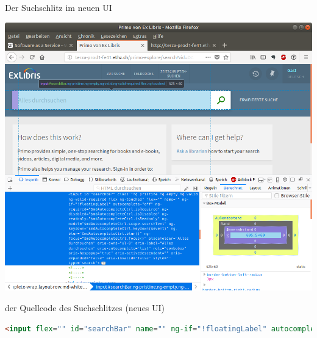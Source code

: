 \begin{frame}{Der Suchschlitz im neuen UI}
  \begin{center}
    \includegraphics[width=1\textwidth]{pics/pnui-searchbar}
  \end{center}
\end{frame}

\begin{frame}[fragile]{der Quellcode des Suchschlitzes (neues UI)}
  \selectfont
  \begin{lstlisting}[language=html]
<input flex="" id="searchBar" name="" ng-if="!floatingLabel" autocomplete="off" ng-required="$mdAutocompleteCtrl.isRequired" ng-disabled="$mdAutocompleteCtrl.isDisabled" ng-readonly="$mdAutocompleteCtrl.isReadonly" ng-model="$mdAutocompleteCtrl.scope.searchText" ng-keydown="$mdAutocompleteCtrl.keydown($event)" ng-blur="$mdAutocompleteCtrl.blur()" ng-focus="$mdAutocompleteCtrl.focus()" placeholder="Alles durchsuchen" aria-owns="ul-0" aria-label="Alles durchsuchen" aria-autocomplete="list" role="combobox" aria-haspopup="true" aria-activedescendant="" aria-expanded="false" class="ng-pristine ng-empty ng-valid ng-valid-required flex ng-touched" aria-invalid="false" style="" type="search">
  \end{lstlisting}
\end{frame}


